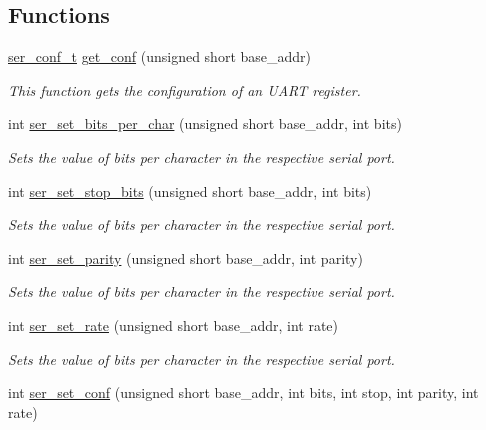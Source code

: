 \subsection*{Functions}
\begin{DoxyCompactItemize}
\item 
\hyperlink{structser__conf__t}{ser\+\_\+conf\+\_\+t} \hyperlink{group__ser__port_gad7f306574426f807f460ddcde260c11b}{get\+\_\+conf} (unsigned short base\+\_\+addr)
\begin{DoxyCompactList}\small\item\em This function gets the configuration of an U\+A\+RT register. \end{DoxyCompactList}\item 
int \hyperlink{group__ser__port_ga03bc33099d89326fb9a26cc0fef1cc7a}{ser\+\_\+set\+\_\+bits\+\_\+per\+\_\+char} (unsigned short base\+\_\+addr, int bits)
\begin{DoxyCompactList}\small\item\em Sets the value of bits per character in the respective serial port. \end{DoxyCompactList}\item 
int \hyperlink{group__ser__port_ga7d67a8d80697182bb1afe90a65875c90}{ser\+\_\+set\+\_\+stop\+\_\+bits} (unsigned short base\+\_\+addr, int bits)
\begin{DoxyCompactList}\small\item\em Sets the value of bits per character in the respective serial port. \end{DoxyCompactList}\item 
int \hyperlink{group__ser__port_ga4a963c8e3cfb978a4e4a026add12483f}{ser\+\_\+set\+\_\+parity} (unsigned short base\+\_\+addr, int parity)
\begin{DoxyCompactList}\small\item\em Sets the value of bits per character in the respective serial port. \end{DoxyCompactList}\item 
int \hyperlink{group__ser__port_ga2b6153e7105a706ea7a331770150ac55}{ser\+\_\+set\+\_\+rate} (unsigned short base\+\_\+addr, int rate)
\begin{DoxyCompactList}\small\item\em Sets the value of bits per character in the respective serial port. \end{DoxyCompactList}\item 
int \hyperlink{group__ser__port_ga1e0894432789b7311021c4f862335065}{ser\+\_\+set\+\_\+conf} (unsigned short base\+\_\+addr, int bits, int stop, int parity, int rate)

\end{DoxyCompactItemize}
